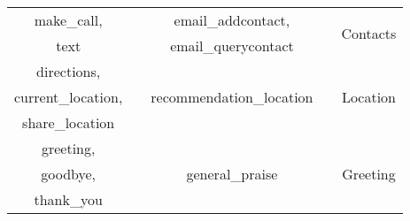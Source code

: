 \documentclass[conference]{IEEEtran}
\newcommand\Tstrut{\rule{0pt}{2.6ex}}
\newcommand\Bstrut{\rule[-0.9ex]{0pt}{0pt}}
\begin{document}
\begin{table}[t]
{\begin{tabular}{c c c c c}
			{\scriptsize make\_call, }       &                    & email\_addcontact,                        &                    & \multirow{2}{*}{Contacts}   \Tstrut \\
			{\scriptsize text}           &                    & email\_querycontact                       &                    & \Bstrut                             \\ \hline
			{\scriptsize directions,}       &                    & \multirow{3}{*}{recommendation\_location} &                    & \multirow{3}{*}{Location}   \Tstrut \\
			{\scriptsize current\_location,}    &                    &                                           &                    &                                     \\
			{\scriptsize share\_location}     &                    &                                           &                    & \Bstrut                             \\ \hline
			{\scriptsize greeting,   }       &                    & \multirow{3}{*}{general\_praise}          &                    & \multirow{3}{*}{Greeting}   \Tstrut \\
			{\scriptsize goodbye,    }       &                    &                                           &                    &                                     \\
			{\scriptsize thank\_you  }       &                    &                                           &                    & \Bstrut                             \\ \bottomrule
		\end{tabular}}
	\label{tab:customDatasetIntents}
\end{table}
\end{document}
